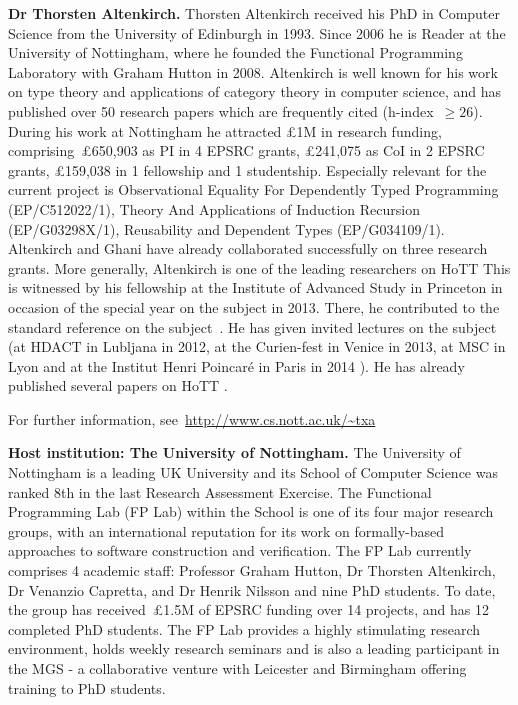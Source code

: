 \documentclass[a4paper,11pt]{article}
\begin{document}
\newpage
\textbf{Dr Thorsten Altenkirch.}  Thorsten Altenkirch received his PhD in
Computer Science from the University of Edinburgh in 1993. Since 2006
he is Reader at the University of Nottingham,
where he founded the Functional Programming Laboratory with Graham
Hutton in 2008. Altenkirch is well known for his work on type theory
and applications of category theory in computer science, and has
published over 50 research papers which are frequently cited (h-index~$\geq 26$). During his
work at Nottingham he attracted \pounds 1M in research funding,
comprising~\pounds650,903 as PI in 4 EPSRC grants, \pounds241,075 as
CoI in 2 EPSRC grants, \pounds159,038 in 1 fellowship and 1
studentship. Especially relevant for the current project is
Observational Equality For Dependently Typed Programming
(EP/C512022/1), Theory And Applications of Induction Recursion
(EP/G03298X/1), Reusability and Dependent Types
(EP/G034109/1). Altenkirch and Ghani have already collaborated
successfully on three research grants. More generally, 
Altenkirch is one of the leading researchers on HoTT
This is witnessed by his fellowship at the Institute of Advanced Study
in Princeton in occasion of the special year on the subject in 2013. There, he contributed to the standard reference on the
subject~\cite{hott-book}.  He has given invited lectures on the
subject (at HDACT in Lubljana in 2012, at the Curien-fest in Venice in
2013, at MSC in Lyon and at the Institut Henri Poincar\'e in Paris in
2014 \cite{txa-ihp14}). He has already published several papers on HoTT
\cite{altenkirch:extSetoids,alti:ott-conf,alti:csl12,alti:tlca13-hedberg}.

For further information, see~\url{http://www.cs.nott.ac.uk/~txa}

\textbf{Host institution: The University of Nottingham.}  The
University of Nottingham is a leading UK University 
and its School of Computer Science was ranked 8th in the last Research
Assessment Exercise. The Functional Programming Lab (FP Lab) within the School
is one of its four major research groups, with an international
reputation for its work on formally-based approaches to software
construction and verification.  The FP Lab currently comprises 4
academic staff: Professor Graham Hutton, Dr Thorsten Altenkirch, Dr
Venanzio Capretta, and Dr Henrik Nilsson and nine PhD students.  To
date, the group has received~\pounds1.5M of EPSRC funding over 14
projects, and has 12 completed PhD students.  The FP Lab provides a highly stimulating research environment,
holds weekly research seminars and is also a leading participant in the MGS - a
collaborative venture with Leicester and Birmingham offering training
to PhD students.
\noindent
\end{document}
